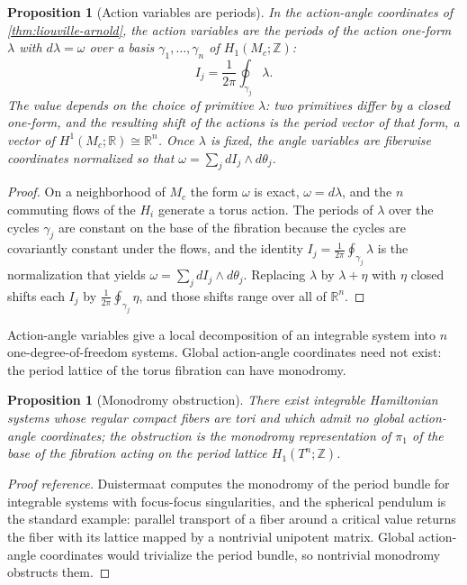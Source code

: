 \documentclass[11pt,letterpaper]{article}
\newtheorem{proposition}[theorem]{Proposition}
\theoremstyle{definition}
\theoremstyle{remark}
\begin{document}
\begin{proposition}[Action variables are periods]
\label{prop:periods}
In the action-angle coordinates of \cref{thm:liouville-arnold}, the action variables are the periods of the action one-form $\lambda$ with $d\lambda = \omega$ over a basis $\gamma_1, \dots, \gamma_n$ of $H_1(M_c; \mathbb{Z})$:
\[
I_j = \frac{1}{2\pi} \oint_{\gamma_j} \lambda.
\]
The value depends on the choice of primitive $\lambda$: two primitives differ by a closed one-form, and the resulting shift of the actions is the period vector of that form, a vector of $H^{1}(M_c; \mathbb{R}) \cong \mathbb{R}^{n}$. Once $\lambda$ is fixed, the angle variables are fiberwise coordinates normalized so that $\omega = \sum_j dI_j \wedge d\theta_j$.
\end{proposition}

\begin{proof}
On a neighborhood of $M_c$ the form $\omega$ is exact, $\omega = d\lambda$, and the $n$ commuting flows of the $H_i$ generate a torus action. The periods of $\lambda$ over the cycles $\gamma_j$ are constant on the base of the fibration because the cycles are covariantly constant under the flows, and the identity $I_j = \frac{1}{2\pi} \oint_{\gamma_j} \lambda$ is the normalization that yields $\omega = \sum_j dI_j \wedge d\theta_j$. Replacing $\lambda$ by $\lambda + \eta$ with $\eta$ closed shifts each $I_j$ by $\frac{1}{2\pi} \oint_{\gamma_j} \eta$, and those shifts range over all of $\mathbb{R}^{n}$.
\end{proof}

Action-angle variables give a local decomposition of an integrable system into $n$ one-degree-of-freedom systems. Global action-angle coordinates need not exist: the period lattice of the torus fibration can have monodromy.

\begin{proposition}[Monodromy obstruction]
\label{prop:monodromy}
There exist integrable Hamiltonian systems whose regular compact fibers are tori and which admit no global action-angle coordinates; the obstruction is the monodromy representation of $\pi_1$ of the base of the fibration acting on the period lattice $H_1(T^{n}; \mathbb{Z})$.
\end{proposition}

\begin{proof}[Proof reference]
Duistermaat \cite{duistermaat} computes the monodromy of the period bundle for integrable systems with focus-focus singularities, and the spherical pendulum is the standard example: parallel transport of a fiber around a critical value returns the fiber with its lattice mapped by a nontrivial unipotent matrix. Global action-angle coordinates would trivialize the period bundle, so nontrivial monodromy obstructs them.
\end{proof}
\end{document}
